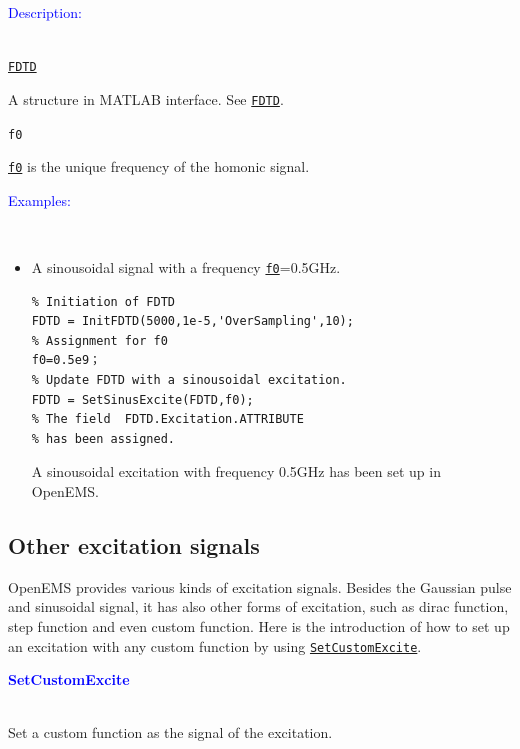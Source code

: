 \textcolor{blue}{\begin{large}Description:\end{large}}\\
	\hyperref[para:FDTD]{\texttt{FDTD}} 
	    \begin{myindentpar}
		A structure in MATLAB interface. See \hyperref[para:FDTD]{\texttt{FDTD}}.
	    \end{myindentpar}
	\texttt{f0}   \label{para:sin_f0} %
	    \begin{myindentpar}
		\hyperref[para:sin_f0]{\texttt{f0}}  is the unique frequency of the homonic signal. 
	    \end{myindentpar}

	\textcolor{blue}{\begin{large}Examples:\end{large}}\\
\begin{itemize}
\item A sinousoidal signal with a  frequency \hyperref[para:sin_f0]{\texttt{f0}}=0.5GHz. 
\begin{lstlisting}
% Initiation of FDTD 
FDTD = InitFDTD(5000,1e-5,'OverSampling',10);
% Assignment for f0
f0=0.5e9；
% Update FDTD with a sinousoidal excitation. 
FDTD = SetSinusExcite(FDTD,f0);
% The field  FDTD.Excitation.ATTRIBUTE
% has been assigned.
\end{lstlisting}
A sinousoidal excitation with frequency 0.5GHz has been set up in OpenEMS. 
\end{itemize}

    \subsection{Other excitation signals}\label{subsec:Other excitation signals}
OpenEMS provides various kinds of excitation signals. Besides the Gaussian pulse and sinusoidal signal, it has also other forms of excitation, such as dirac function, step function and even custom function. Here is the introduction of how to set up an excitation with any custom function by using \hyperref[func:SetCustomExcite]{\texttt{SetCustomExcite}}.

\textcolor{blue}{\begin{large}\textbf{SetCustomExcite}	\end{large}} \label{func:SetCustomExcite}\\
	  Set a custom function as the signal of the excitation.

